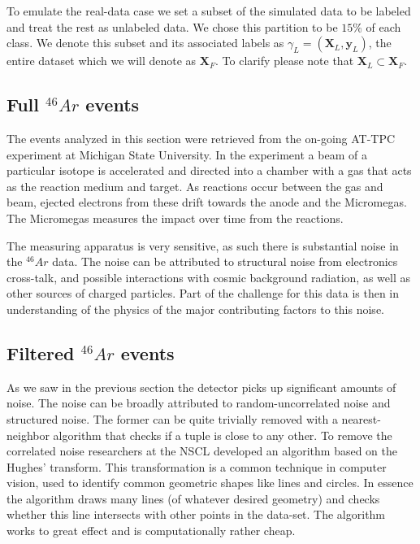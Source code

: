 To emulate the real-data case we set a subset of the simulated data to be labeled and treat the rest as unlabeled data. We chose this partition to be $15\%$ of each class. We denote this subset and its associated labels as $\gamma_L=(\mathbf{X}_L, \mathbf{y}_L)$, the entire dataset which we will denote as $\mathbf{X}_F$. To clarify please note that $\mathbf{X}_L \subset \mathbf{X}_F$.


\subsection{Full \texorpdfstring{${}^{46}Ar$}{46Ar}  events}\label{sec:data_real}

The events analyzed in this section were retrieved from the on-going AT-TPC experiment at Michigan State University. In the experiment a beam of a particular isotope is accelerated and directed into a chamber with a gas that acts as the reaction medium and target. As reactions occur between the gas and beam, ejected electrons from these drift towards the anode and the Micromegas. The Micromegas measures the impact over time from the reactions.

The measuring apparatus is very sensitive, as such there is substantial noise in the ${}^{46}Ar$ data. The noise can be attributed to structural noise from electronics cross-talk, and possible interactions with cosmic background radiation, as well as other sources of charged particles. Part of the challenge for this data is then in understanding of the physics of the major contributing factors to this noise. 

\subsection{Filtered \texorpdfstring{${}^{46}Ar$}{46Ar} events}

As we saw in the previous section the detector picks up significant amounts of noise. The noise can be broadly attributed to random-uncorrelated noise and structured noise. The former can be quite trivially removed with a nearest-neighbor algorithm that checks if a tuple is close to any other. To remove the correlated noise researchers at the NSCL developed an algorithm based on the Hughes' transform. This transformation is a common technique in computer vision, used to identify common geometric shapes like lines and circles. In essence the algorithm draws many lines (of whatever desired geometry) and checks whether this line intersects with other points in the data-set. The algorithm works to great effect and is computationally rather cheap.


